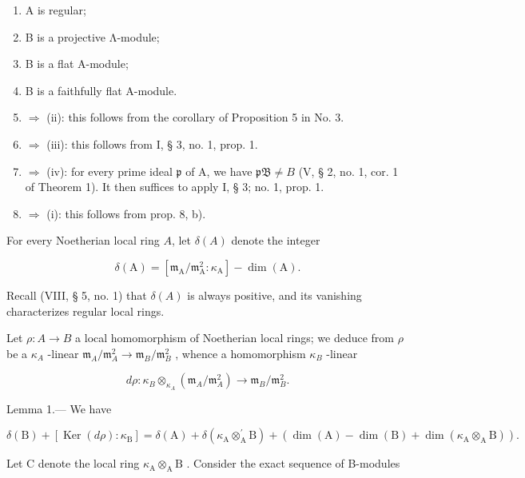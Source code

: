 \begin{enumerate}
\def\labelenumi{(\roman{enumi})}
\item
  A is regular;
\item
  B is a projective Λ-module;
\item
  B is a flat A-module;
\item
  B is a faithfully flat A-module.
\item
  \(\Rightarrow\) (ii): this follows from the corollary of Proposition 5 in No. 3.
\item
  \(\Rightarrow\) (iii): this follows from I, § 3, no. 1, prop. 1.
\item
  \(\Rightarrow\) (iv): for every prime ideal \(\mathfrak{p}\) of A, we have \(\mathfrak{pB} \neq B\) (V, § 2, no. 1, cor. 1 of Theorem 1). It then suffices to apply I, § 3; no. 1, prop. 1.
\item
  \(\Rightarrow\) (i): this follows from prop. 8, b).
\end{enumerate}

For every Noetherian local ring \( A \), let \( \delta(A) \) denote the integer

\[
\delta (\mathrm{A}) = \left[ \mathfrak {m} _ {\mathrm{A}} / \mathfrak {m} _ {\mathrm{A}} ^ {2}: \kappa_ {\mathrm{A}} \right] - \dim (\mathrm{A}).
\]

Recall (VIII, § 5, no. 1) that \(\delta(A)\) is always positive, and its vanishing characterizes regular local rings.

Let \(\rho : A \to B\) a local homomorphism of Noetherian local rings; we deduce from \(\rho\) be a \(\kappa_{A}\) -linear \(\mathfrak{m}_{A}/\mathfrak{m}_{A}^{2} \longrightarrow \mathfrak{m}_{B}/\mathfrak{m}_{B}^{2}\) , whence a homomorphism \(\kappa_{B}\) -linear

\[
d \rho : \kappa_ {B} \otimes_ {\kappa_ {A}} \left(\mathfrak {m} _ {A} / \mathfrak {m} _ {A} ^ {2}\right) \longrightarrow \mathfrak {m} _ {B} / \mathfrak {m} _ {B} ^ {2}.
\]

Lemma 1.--- We have

\[
\delta (\mathrm{B}) + \left[ \operatorname{Ker} (d \rho): \kappa_ {\mathrm{B}} \right] = \delta (\mathrm{A}) + \delta \left(\kappa_ {\mathrm{A}} \otimes_ {\mathrm{A}} ^ {\prime} \mathrm{B}\right) + (\dim (\mathrm{A}) - \dim (\mathrm{B}) + \dim \left(\kappa_ {\mathrm{A}} \otimes_ {\mathrm{A}} \mathrm{B}\right)).
\]

Let C denote the local ring \(\kappa_{\mathrm{A}}\otimes_{\mathrm{A}}\mathrm{B}\) . Consider the exact sequence of B-modules

